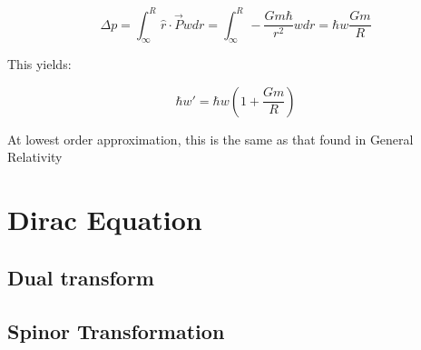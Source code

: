 \documentclass {article}
\begin{document}
$$\Delta p = \int_{\infty}^R \hat r \cdot \vec P w dr= \int_{\infty}^R - \frac {Gm\hbar}{r^2} w dr = \hbar w \frac {Gm}R $$

This yields:

$$\hbar w' = \hbar w \left( 1 + \frac {Gm}R \right) $$

At lowest order approximation, this is the same as that found in General Relativity

\newpage

\section{Dirac Equation}
\subsection{Dual transform}
\newpage
\subsection{Spinor Transformation}
\newpage
\end{document}
